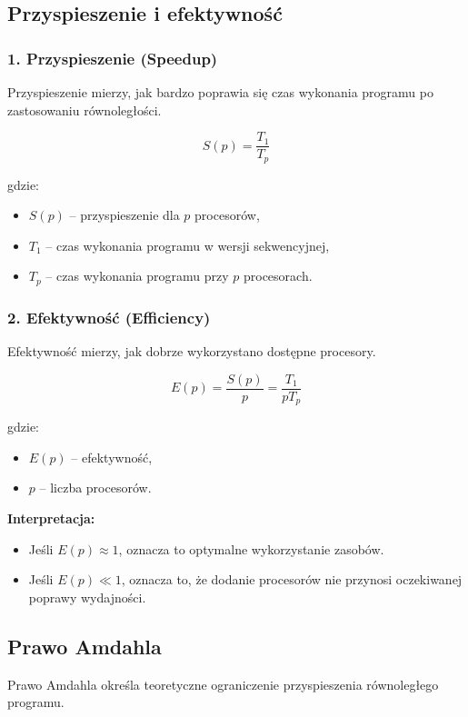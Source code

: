 \subsection{Przyspieszenie i efektywność}

\subsubsection{1. Przyspieszenie (Speedup)}
Przyspieszenie mierzy, jak bardzo poprawia się czas wykonania programu po zastosowaniu równoległości.

\begin{equation}
    S(p) = \frac{T_1}{T_p}
\end{equation}

gdzie:
\begin{itemize}
    \item \( S(p) \) – przyspieszenie dla \( p \) procesorów,
    \item \( T_1 \) – czas wykonania programu w wersji sekwencyjnej,
    \item \( T_p \) – czas wykonania programu przy \( p \) procesorach.
\end{itemize}

\subsubsection{2. Efektywność (Efficiency)}
Efektywność mierzy, jak dobrze wykorzystano dostępne procesory.

\begin{equation}
    E(p) = \frac{S(p)}{p} = \frac{T_1}{p T_p}
\end{equation}

gdzie:
\begin{itemize}
    \item \( E(p) \) – efektywność,
    \item \( p \) – liczba procesorów.
\end{itemize}

\textbf{Interpretacja:}
\begin{itemize}
    \item Jeśli \( E(p) \approx 1 \), oznacza to optymalne wykorzystanie zasobów.
    \item Jeśli \( E(p) \ll 1 \), oznacza to, że dodanie procesorów nie przynosi oczekiwanej poprawy wydajności.
\end{itemize}

\subsection{Prawo Amdahla}
Prawo Amdahla określa teoretyczne ograniczenie przyspieszenia równoległego programu.

